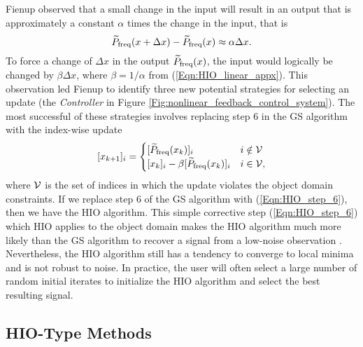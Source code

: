 Fienup observed that a small change in the input will result in an output that is approximately a constant $\alpha$ times the change in the input, that is
\begin{equation} 		\label{Eqn:HIO_linear_appx}
	\widetilde{P}_\textnormal{freq}(x + \Delta x) - \widetilde{P}_\textnormal{freq}(x) \approx \alpha \Delta x.
\end{equation}
To force a change of $\Delta x$ in the output $\widetilde{P}_\textnormal{freq}(x)$, the input would logically be changed by $\beta \Delta x$, where $\beta = 1/\alpha$ from (\ref{Eqn:HIO_linear_appx}).  
This observation led Fienup to identify three new potential strategies for selecting an update (the \textit{Controller} in Figure \ref{Fig:nonlinear_feedback_control_system}).  
The most successful of these strategies involves replacing step 6 in the GS algorithm with the index-wise update
\begin{equation} 		\label{Eqn:HIO_step_6}
[x_{k+1}]_i =
	\begin{cases}
		[\widetilde{P}_\textnormal{freq}(x_k)]_i	&	i \notin {\mathcal V}		\\
		[x_k]_i - \beta [\widetilde{P}_\textnormal{freq}(x_k)]_i			&	 i \in {\mathcal V},
	\end{cases}
\end{equation}
where ${\mathcal V}$ is the set of indices in which the update violates the object domain constraints.
If we replace step 6 of the GS algorithm with (\ref{Eqn:HIO_step_6}), then we have the HIO algorithm.
This simple corrective step (\ref{Eqn:HIO_step_6}) which HIO applies to the object domain makes the HIO algorithm much more likely than the GS algorithm to recover a signal from a low-noise observation \cite{DBLP:journals/corr/JaganathanEH15a}.   
Nevertheless, the HIO algorithm still has a tendency to converge to local minima and is not robust to noise.  
In practice, the user will often select a large number of random initial iterates to initialize the HIO algorithm and select the best resulting signal.





\subsection{HIO-Type Methods}


